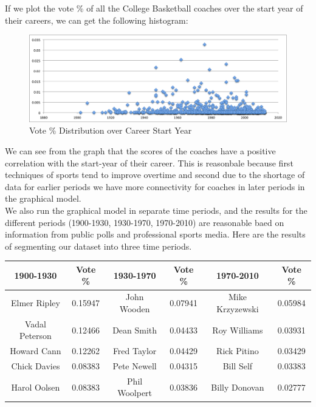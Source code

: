 \documentclass[11pt,notitlepage]{article}
\begin{document}
If we plot the vote \% of all the College Basketball coaches over the start year of their careers, we can get the following histogram:

\begin{figure}[H]
      \caption{Vote \% Distribution over Career Start Year}
      \centering
      \includegraphics[width=1\textwidth]{graphs/time_horizon.png}
 \end{figure}

\noindent We can see from the graph that the scores of the coaches have a positive correlation with the start-year of their career. This is reasonbale because first techniques of sports tend to improve overtime and second due to the shortage of data for earlier periods we have more connectivity for coaches in later periods in the graphical model.
\\

\noindent We also run the graphical model in separate time periods, and the results for the different periods (1900-1930, 1930-1970, 1970-2010) are reasonable baed on information from public polls and professional sports media. Here are the results of segmenting our dataset into three time periods.

\begin{center}

\begin{tabular}{ | c | c | c| c | c| c| }

\hline

1900-1930  & Vote \% & 1930-1970  & Vote \% & 1970-2010  & Vote \% \\\hline

Elmer Ripley & 0.15947 & John Wooden & 0.07941 & Mike Krzyzewski & 0.05984 \\\hline

Vadal Peterson & 0.12466 & Dean Smith & 0.04433 & Roy Williams & 0.03931\\\hline

Howard Cann  &0.12262 & Fred Taylor & 0.04429 & Rick Pitino & 0.03429\\\hline

Chick Davies & 0.08383 & Pete Newell & 0.04315 & Bill Self & 0.03383 \\\hline

Harol Oolsen & 0.08383 & Phil Woolpert & 0.03836 & Billy Donovan & 0.02777\\

\hline

\end{tabular}

\end{center}
\end{document}
